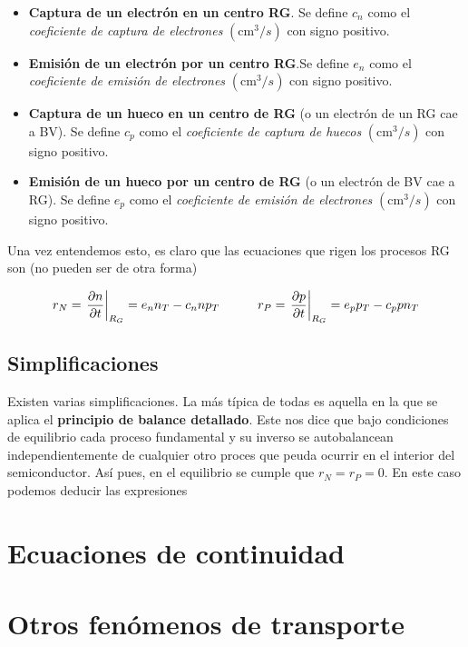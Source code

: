 \begin{itemize}
	\item \textbf{Captura de un electrón en un centro RG}. Se define $c_n$ como el \textit{coeficiente de captura de electrones} $(\text{cm}^3/s)$ con signo positivo. 
	\item \textbf{Emisión de un electrón por un centro RG}.Se define $e_n$ como el \textit{coeficiente de emisión de electrones} $(\text{cm}^3/s)$ con signo positivo. 
	\item \textbf{Captura de un hueco en un centro de RG} (o un electrón de un RG cae a BV). Se define $c_p$ como el \textit{coeficiente de captura de huecos} $(\text{cm}^3/s)$ con signo positivo. 
	\item \textbf{Emisión de un hueco por un centro de RG} (o un electrón de BV cae a RG). Se define $e_p$ como el \textit{coeficiente de emisión de electrones} $(\text{cm}^3/s)$ con signo positivo.  
\end{itemize}
Una vez entendemos esto, es claro que las ecuaciones que rigen los procesos RG son (no pueden ser de otra forma)

\begin{equation}
	r_N = \eval{\parciales{n}{t}}_{R_G} = e_n n_T - c_n n p_T \tquad r_P = 	\eval{\parciales{p}{t}}_{R_G} = e_pp_T - c_p p n_T
\end{equation}

\subsection{Simplificaciones}

Existen varias simplificaciones. La más típica de todas es aquella en la que se aplica el \textbf{principio de balance detallado}. Este nos dice que bajo condiciones de equilibrio cada proceso fundamental y su inverso se autobalancean independientemente de cualquier otro proces que peuda ocurrir en el interior del semiconductor. Así pues, en el equilibrio se cumple que $r_N=r_P=0$. En este caso podemos deducir las expresiones


\section{Ecuaciones de continuidad}


\section{Otros fenómenos de transporte}



















